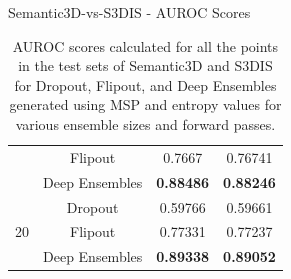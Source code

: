 \documentclass[aspectratio=169]{beamer}
\begin{document}
\begin{frame}{Semantic3D-vs-S3DIS - AUROC Scores}
\begin{table}[h!]
{\begin{tabular}{cccc}
                                        & Flipout              & 0.7667           & 0.76741          \\
                                        & Deep Ensembles       & \textbf{0.88486} & \textbf{0.88246} \\ \hline
                \multirow{3}{*}{20}     & Dropout              & 0.59766          & 0.59661          \\
                                        & Flipout              & 0.77331          & 0.77237          \\
                                        & Deep Ensembles       & \textbf{0.89338} & \textbf{0.89052} \\ \hline
                \end{tabular}
                }
                \caption{AUROC scores calculated for all the points in the test sets of Semantic3D and S3DIS for Dropout, Flipout, and  Deep Ensembles generated using MSP and entropy values for various ensemble sizes and forward passes.}
                \label{tab:sem3dvs3dis_auroc}
            \end{table}
\end{frame}
\end{document}
